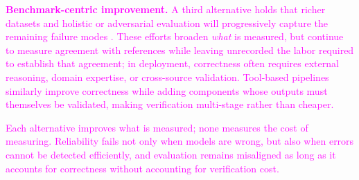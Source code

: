 \documentclass[11pt]{article}
\newcommand{\rev}[1]{\textcolor{magenta}{#1}}
\newcommand{\rev}[1]{#1}
\begin{document}
\rev{\textbf{Benchmark-centric improvement.} A third alternative holds that richer datasets and holistic or adversarial evaluation will progressively capture the remaining failure modes \citep{liang2023helm,kiela2021dynabench,kapoor2026hal}. These efforts broaden \emph{what} is measured, but continue to measure agreement with references while leaving unrecorded the labor required to establish that agreement; in deployment, correctness often requires external reasoning, domain expertise, or cross-source validation. Tool-based pipelines \citep{gao2023pal} similarly improve correctness while adding components whose outputs must themselves be validated, making verification multi-stage rather than cheaper.}

\rev{Each alternative improves what is measured; none measures the cost of measuring. Reliability fails not only when models are wrong, but also when errors cannot be detected efficiently, and evaluation remains misaligned as long as it accounts for correctness without accounting for verification cost.}
\end{document}

